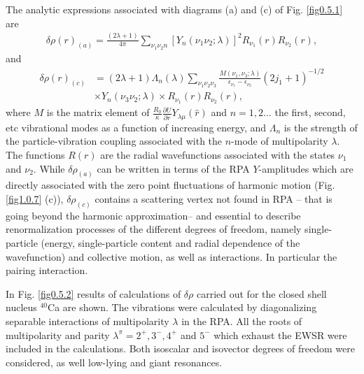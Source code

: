 The analytic expressions associated with diagrams (a) and (c) of Fig. \ref{fig0.5.1} are 
\begin{align}\label{eq0.1.127}
\delta\rho(r)_{(a)}=\frac{(2\lambda+1)}{4\pi}\sum_{\nu_1\nu_2 n}\left[Y_n(\nu_1\nu_2;\lambda)\right]^2 R_{\nu_1}(r)R_{\nu_2}(r),
\end{align}
and
\begin{align}\label{eq0.1.128}
\nonumber \delta\rho(r)_{(c)}&=(2\lambda+1)\Lambda_n(\lambda)\sum_{\nu_1\nu_2\nu_3}\frac{M(\nu_1,\nu_3;\lambda)}{\epsilon_{\nu_1}-\epsilon_{\nu_2}}(2j_1+1)^{-1/2}\\&\times Y_n(\nu_3\nu_2;\lambda)\times R_{\nu_1}(r)R_{\nu_2}(r),
\end{align}
where $M$ is the matrix element of $\frac{R_0}{\kappa}\frac{\partial U}{\partial r}Y_{\lambda\mu}(\hat r)$ and $n=1,2\dots$ the first, second, etc vibrational modes as a function of increasing energy, and $\Lambda_n$ is the strength of the particle-vibration coupling associated with the $n$-mode of multipolarity $\lambda$. The functions $R(r)$ are the radial wavefunctions associated with the states $\nu_1$ and $\nu_2$. While $\delta\rho_{(a)}$ can be written in terms of the RPA $Y$-amplitudes which are directly associated with the zero point fluctuations of harmonic motion (Fig. \ref{fig1.0.7} (c)), $\delta\rho_{(c)}$ contains a scattering vertex not found in RPA -- that is going beyond the harmonic approximation-- and essential to describe renormalization processes of the different degrees of freedom, namely single-particle (energy, single-particle content and radial dependence of the wavefunction) and collective motion, as well as interactions. In particular the pairing interaction. 

In Fig. \ref{fig0.5.2}  results of calculations of $\delta\rho$ carried out for the closed shell nucleus $^{40}$Ca are shown. The vibrations were calculated by diagonalizing separable interactions of multipolarity $\lambda$ in the RPA. All the roots of multipolarity and parity $\lambda^\pi=2^+,3^-,4^+$ and $5^-$ which exhaust the EWSR were included in the calculations. Both isoscalar and isovector degrees of freedom were considered, as well  low-lying and giant resonances.

